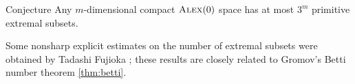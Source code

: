 \begin{thm}{Conjecture}
Any $m$-dimensional compact $\textup{\textsc{Alex}}(0)$ space has at most $3^m$ primitive extremal subsets.
\end{thm}

Some nonsharp explicit estimates on the number of extremal subsets
were obtained by Tadashi Fujioka \cite{fujioka2025};
these results are closely related to Gromov's Betti number theorem \ref{thm:betti}.
